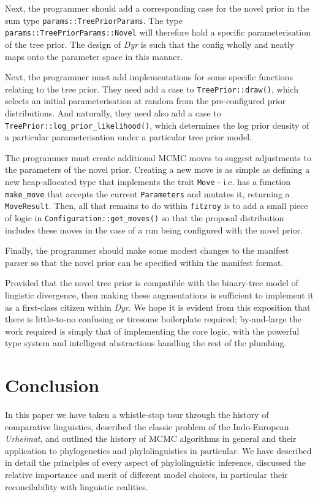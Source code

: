 \documentclass[10pt,journal,compsoc]{IEEEtran}
\begin{document}
Next, the programmer should add a corresponding case for the novel prior in the sum type \texttt{params::TreePriorParams}. The type \texttt{params::TreePriorParams::Novel} will therefore hold a specific parameterisation of the tree prior. The design of \textit{Dyr} is such that the config wholly and neatly maps onto the parameter space in this manner.

Next, the programmer must add implementations for some specific functions relating to the tree prior. They need add a case to \texttt{TreePrior::draw()}, which selects an initial parameterisation at random from the pre-configured prior distributions. And naturally, they need also add a case to \texttt{TreePrior::log\_prior\_likelihood()}, which determines the log prior density of a particular parameterisation under a particular tree prior model.

The programmer must create additional MCMC moves to suggest adjustments to the parameters of the novel prior. Creating a new move is as simple as defining a new heap-allocated type that implements the trait \texttt{Move} - i.e. has a function \texttt{make\_move} that accepts the current \texttt{Parameters} and mutates it, returning a \texttt{MoveResult}. Then, all that remains to do within \texttt{fitzroy} is to add a small piece of logic in \texttt{Configuration::get\_moves()} so that the proposal distribution includes these moves in the case of a run being configured with the novel prior.

Finally, the programmer should make some modest changes to the manifest parser so that the novel prior can be specified within the manifest format.

Provided that the novel tree prior is compatible with the binary-tree model of lingistic divergence, then making these augmentations is sufficient to implement it as a first-class citizen within \textit{Dyr}. We hope it is evident from this exposition that there is little-to-no confusing or tiresome boilerplate required; by-and-large the work required is simply that of implementing the core logic, with the powerful type system and intelligent abstractions handling the rest of the plumbing.

\section{Conclusion}\label{sec:conclusion}

In this paper we have taken a whistle-stop tour through the history of comparative linguistics, described the classic problem of the Indo-European \textit{Urheimat}, and outlined the history of MCMC algorithms in general and their application to phylogenetics and phylolinguistics in particular. We have described in detail the principles of every aspect of phylolinguistic inference, discussed the relative importance and merit of different model choices, in particular their reconcilability with linguistic realities.
\end{document}
